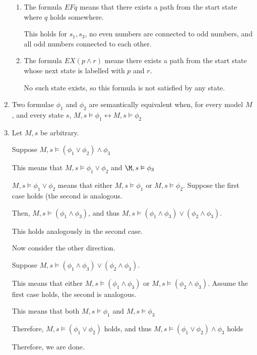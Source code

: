 \begin{enumerate}[label=(\alph*)]
\begin{enumerate}[label=(\roman*)]
          \item
            The formula $E F q$ means that there exists a path from the start state where $q$ holds somewhere.

            This holds for $s_1, s_3$, no even numbers are connected to odd numbers, and all odd numbers connected to each other.

            \item
              The formula $E X (p \wedge r)$ means there exists a path from the start state whose next state is labelled with $p$ and $r$.

              No such state exists, so this formula is not satisfied by any state.
          
      \end{enumerate}

      \item

        Two formulae $\phi_1$ and $\phi_2$ are semantically equivalent when, for every model $M$, and every state $s$, $M, s \vDash \phi_1 \leftrightarrow M, s \vDash \phi_2$

        \item

          Let $M, s$ be arbitrary.

          Suppose $M,s \vDash (\phi_1 \vee \phi_2) \wedge \phi_3$

          This means that $M,s \vDash \phi_1 \vee \phi_2$ and $\M,s \vDash \phi_3$

          $M,s \vDash \phi_1 \vee \phi_2$ means that either $M,s \vDash \phi_1$ or $M,s \vDash \phi_2$. Suppose the first case holds (the second is analogous.

          Then, $M,s \vDash (\phi_1 \wedge \phi_3)$, and thus $M,s \vDash (\phi_1 \wedge \phi_3) \vee (\phi_2 \wedge \phi_3)$.

          This holds analogously in the second case.

          Now consider the other direction.

          Suppose $M, s \vDash (\phi_1 \wedge \phi_3) \vee (\phi_2 \wedge \phi_3)$.

          This means that either $M,s \vDash (\phi_1 \wedge \phi_3)$ or $M,s \vDash (\phi_2 \wedge \phi_3)$. Assume the first case holds, the second is analogous.

          This means that both $M,s \vDash \phi_1$ and $M,s \vDash \phi_3$

          Therefore, $M, s \vDash (\phi_1 \vee \phi_2)$ holds, and thus $M, s \vDash (\phi_1 \vee \phi_2) \wedge \phi_3$ holds

          Therefore, we are done.







        
    \end{enumerate}


